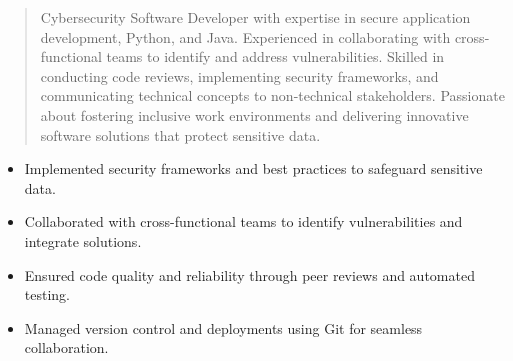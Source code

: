 



\makecvheader


\begin{quote}
  \noindent
  Cybersecurity Software Developer with expertise in secure application development, Python, and Java. Experienced in collaborating with cross-functional teams to identify and address vulnerabilities. Skilled in conducting code reviews, implementing security frameworks, and communicating technical concepts to non-technical stakeholders. Passionate about fostering inclusive work environments and delivering innovative software solutions that protect sensitive data.
\end{quote}

\par\smallskip
\noindent
\begin{minipage}{20cm}
  \begin{minipage}{9.75cm}
    \begin{itemize}
      \item Implemented security frameworks and best practices to safeguard sensitive data.
      \item Collaborated with cross-functional teams to identify vulnerabilities and integrate solutions.
    \end{itemize}
  \end{minipage}
  \hfill
  \begin{minipage}{9.75cm}
    \begin{itemize}
      \item Ensured code quality and reliability through peer reviews and automated testing.
      \item Managed version control and deployments using Git for seamless collaboration.
    \end{itemize}
  \end{minipage}
\end{minipage}
\par\smallskip
\divider

